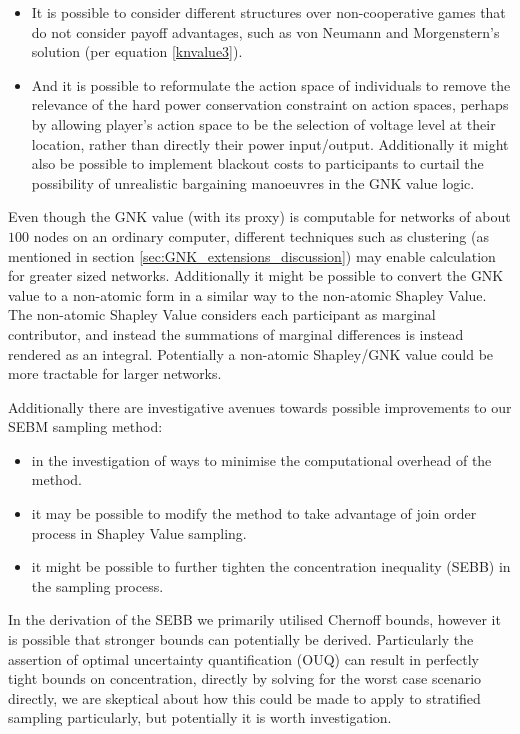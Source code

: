 \begin{itemize}
\item	It is possible to consider different structures over non-cooperative games that do not consider payoff advantages, such as von Neumann and Morgenstern's solution (per equation \ref{knvalue3}).
\item	And it is possible to reformulate the action space of individuals to remove the relevance of the hard power conservation constraint on action spaces, perhaps by allowing player's action space to be the selection of voltage level at their location, rather than directly their power input/output. Additionally it might also be possible to implement blackout costs to participants to curtail the possibility of unrealistic bargaining manoeuvres in the GNK value logic.
\end{itemize}


Even though the GNK value (with its proxy) is computable for networks of about $100$ nodes on an ordinary computer, different techniques such as clustering (as mentioned in section \ref{sec:GNK_extensions_discussion}) may enable calculation for greater sized networks.
Additionally it might be possible to convert the GNK value to a non-atomic form in a similar way to the non-atomic Shapley Value.
The non-atomic Shapley Value considers each participant as marginal contributor, and instead the summations of marginal differences is instead rendered as an integral. Potentially a non-atomic Shapley/GNK value could be more tractable for larger networks.

Additionally there are investigative avenues towards possible improvements to our SEBM sampling method:
\begin{itemize}
\item	in the investigation of ways to minimise the computational overhead of the method.
\item	it may be possible to modify the method to take advantage of join order process in Shapley Value sampling.
\item	it might be possible to further tighten the concentration inequality (SEBB) in the sampling process.
\end{itemize}

In the derivation of the SEBB we primarily utilised Chernoff bounds, however it is possible that stronger bounds can potentially be derived.
Particularly the assertion of optimal uncertainty quantification (OUQ) can result in perfectly tight bounds on concentration, directly by solving for the worst case scenario directly, we are skeptical about how this could be made to apply to stratified sampling particularly, but potentially it is worth investigation.\citep{OUQ1,doi:10.1137/13094712X}

